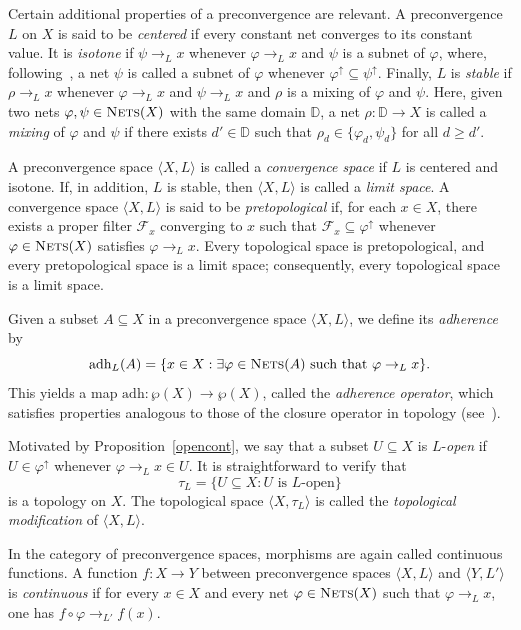 \documentclass{amsart}
\theoremstyle{definition}
\theoremstyle{remark}
\numberwithin{equation}{section}
\begin{document}
Certain additional properties of a preconvergence are relevant. A preconvergence $L$ on $X$ is said to be \emph{centered} if every constant net converges to its constant value. It is \emph{isotone} if $\psi\to_L x$ whenever $\varphi\to_L x$ and $\psi$ is a subnet of $\varphi$, where, following~\cite{schechter}, a net $\psi$ is called a subnet of $\varphi$ whenever $\varphi^{\uparrow}\subseteq\psi^{\uparrow}$. Finally, $L$ is \emph{stable} if $\rho\to_L x$ whenever $\varphi\to_L x$ and $\psi\to_L x$ and $\rho$ is a mixing of $\varphi$ and $\psi$. Here, given two nets $\varphi,\psi\in\textsc{Nets}(X)$ with the same domain $\mathbb{D}$, a net $\rho\colon\mathbb{D}\to X$ is called a \emph{mixing} of $\varphi$ and $\psi$ if there exists $d'\in\mathbb{D}$ such that $\rho_d\in\{\varphi_d,\psi_d\}$ for all $d\geq d'$.

A preconvergence space $\langle X,L\rangle$ is called a \emph{convergence space} if $L$ is centered and isotone. If, in addition, $L$ is stable, then $\langle X,L\rangle$ is called a \emph{limit space}. A convergence space $\langle X,L\rangle$ is said to be \emph{pretopological} if, for each $x\in X$, there exists a proper filter $\mathcal{F}_x$ converging to $x$ such that $\mathcal{F}_x\subseteq\varphi^{\uparrow}$ whenever $\varphi\in\textsc{Nets}(X)$ satisfies $\varphi\to_L x$. Every topological space is pretopological, and every pretopological space is a limit space; consequently, every topological space is a limit space.

Given a subset $A\subseteq X$ in a preconvergence space $\langle X,L\rangle$, we define its \emph{adherence} by
\[
\mathrm{adh}_L(A)=\{x\in X: \exists \varphi\in\textsc{Nets}(A)\ \text{such that}\ \varphi\to_L x\}.
\]
This yields a map $\mathrm{adh}:\wp(X)\to\wp(X)$, called the \emph{adherence operator}, which satisfies properties analogous to those of the closure operator in topology (see~\cite{dol}).

Motivated by Proposition~\ref{opencont}, we say that a subset $U\subseteq X$ is $L$-\emph{open} if $U\in\varphi^{\uparrow}$ whenever $\varphi\to_L x\in U$. It is straightforward to verify that
\[
\tau_L=\{U\subseteq X: U \text{ is } L\text{-open}\}
\]
is a topology on $X$. The topological space $\langle X,\tau_L\rangle$ is called the \emph{topological modification} of $\langle X,L\rangle$.

In the category of preconvergence spaces, morphisms are again called continuous functions. A function $f\colon X\to Y$ between preconvergence spaces $\langle X,L\rangle$ and $\langle Y,L'\rangle$ is \emph{continuous} if for every $x\in X$ and every net $\varphi\in\textsc{Nets}(X)$ such that $\varphi\to_L x$, one has $f\circ\varphi\to_{L'} f(x)$.
\end{document}
